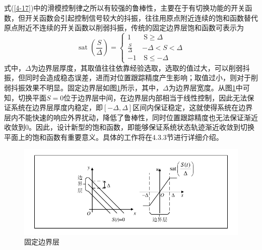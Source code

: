式(\ref{4-17})中的滑模控制律之所以有较强的鲁棒性，主要在于有切换功能的开关函数，但开关函数会引起控制信号较大的抖振，往往用原点附近连续的饱和函数替代原点附近不连续的开关函数以削弱抖振，传统的固定边界层饱和函数可表示为
\begin{equation}
\label{4-23}
\operatorname{sat}\left(\frac{S}{\Delta}\right)=\left\{\begin{array}{ll}
1 & \mathrm{~S} \geq \Delta \\
\frac{S}{\Delta} & -\Delta<S<\Delta \\
-1 & \mathrm{~S} \leq-\Delta
\end{array}\right.
\end{equation}
式中，$\Delta$为边界层厚度，其取值往往依靠经验选取，选取的值过大，可以削弱抖振，但同时会造成稳态误差，进而对位置跟踪精度产生影响；取值过小，则对于削弱抖振效果不明显\cite{jin2007investigation}。固定边界层如图\ref{固定边界层}所示，其中，$\Delta$为边界层宽度。从图\ref{固定边界层}中可知，切换平面$S=0$位于边界层中间，在边界层内部相当于线性控制，因此无法保证系统在边界层厚度内稳定，即$[-\Delta,\Delta]$区间内保证稳定，这就使得系统在边界层内不能快速的响应外界扰动，降低了鲁棒性，同时位置跟踪精度也无法保证渐近收敛到$0$。因此，设计新型的饱和函数，即能够保证系统状态轨迹渐近收敛到切换平面上的饱和函数有重要意义。具体的工作将在4.3.3节进行详细介绍。
\begin{figure}[H]
	\centering
	\includegraphics[width=12cm]{figures/固定边界层1.pdf}
	\caption{固定边界层}
	\label{固定边界层}
\end{figure}





